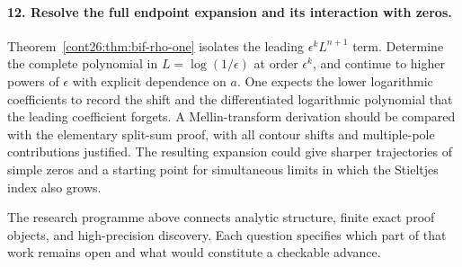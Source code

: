 \paragraph{12. Resolve the full endpoint expansion and its interaction
with zeros.}
Theorem~\ref{cont26:thm:bif-rho-one} isolates the leading
$\epsilon^kL^{n+1}$ term. Determine the complete polynomial in
$L=\log(1/\epsilon)$ at order $\epsilon^k$, and continue to
higher powers of $\epsilon$ with explicit dependence on $a$.
One expects the lower logarithmic coefficients to record the
shift and the differentiated logarithmic polynomial that the
leading coefficient forgets. A Mellin-transform derivation should
be compared with the elementary split-sum proof, with all contour
shifts and multiple-pole contributions justified.
The resulting expansion could give sharper trajectories of
simple zeros and a starting point for simultaneous limits in
which the Stieltjes index also grows.

The research programme above connects analytic structure, finite
exact proof objects, and high-precision discovery. Each question
specifies which part of that work remains open and what would
constitute a checkable advance.

